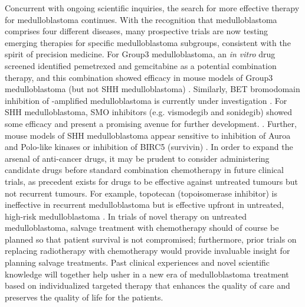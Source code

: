 Concurrent with ongoing scientific inquiries, the search for more effective therapy for medulloblastoma continues. With the recognition that medulloblastoma comprises four different diseases, many prospective trials are now testing emerging therapies for specific medulloblastoma subgroups, consistent with the spirit of precision medicine. For Group3 medulloblastoma, an \emph{in vitro} drug screened identified  pemetrexed and gemcitabine as a potential combination therapy, and this combination showed efficacy in mouse models of Group3 medulloblastoma (but not SHH medulloblastoma) . Similarly, BET bromodomain inhibition of -amplified medulloblastoma is currently under investigation . For SHH medulloblastoma, SMO inhibitors (e.g. vismodegib and sonidegib) showed some efficacy and present a promising avenue for further development. . Further, mouse models of SHH medulloblastoma appear sensitive to inhibition of Auroa and Polo-like kinases  or inhibition of BIRC5 (survivin) . In order to expand the arsenal of anti-cancer drugs, it may be prudent to consider administering candidate drugs before standard combination chemotherapy in future clinical trials, as precedent exists for drugs to be effective against untreated tumours but not recurrent tumours. For example, topotecan (topoisomerase inhibitor) is ineffective in recurrent medulloblastoma  but is effective upfront in untreated, high-risk medulloblastoma . In trials of novel therapy on untreated medulloblastoma, salvage treatment with chemotherapy should of course be planned so that patient survival is not compromised; furthermore, prior trials on replacing radiotherapy with chemotherapy would provide invaluable insight for planning salvage treatments. Past clinical experiences and novel scientific knowledge will together help usher in a new era of medulloblastoma treatment based on individualized targeted therapy that enhances the quality of care and preserves the quality of life for the patients.


